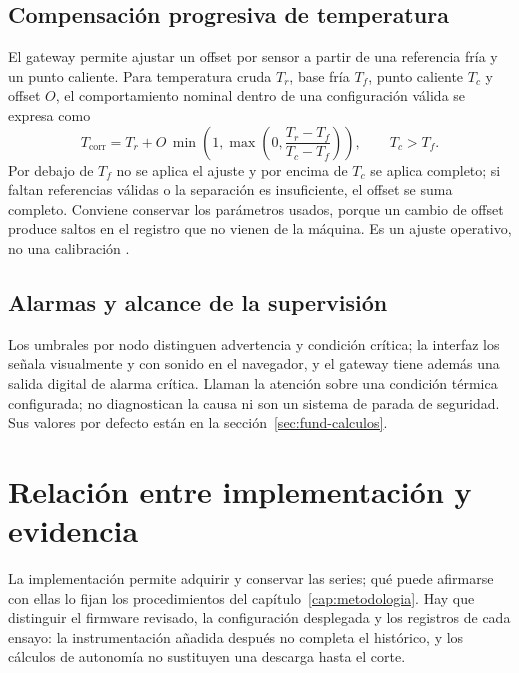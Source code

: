 \subsection{Compensación progresiva de temperatura}
El gateway permite ajustar un offset por sensor a partir de una referencia fría y un punto caliente. Para temperatura cruda $T_r$, base fría $T_f$, punto caliente $T_c$ y offset $O$, el comportamiento nominal dentro de una configuración válida se expresa como
\begin{equation}
T_{\mathrm{corr}}=T_r+O\,\min\!\left(1,\max\!\left(0,\frac{T_r-T_f}{T_c-T_f}\right)\right),
\qquad T_c>T_f.
\label{eq:impl-offset}
\end{equation}
Por debajo de $T_f$ no se aplica el ajuste y por encima de $T_c$ se aplica completo; si faltan referencias válidas o la separación es insuficiente, el offset se suma completo. Conviene conservar los parámetros usados, porque un cambio de offset produce saltos en el registro que no vienen de la máquina. Es un ajuste operativo, no una calibración \citep{jcgm2012}.

\subsection{Alarmas y alcance de la supervisión}
Los umbrales por nodo distinguen advertencia y condición crítica; la interfaz los señala visualmente y con sonido en el navegador, y el gateway tiene además una salida digital de alarma crítica. Llaman la atención sobre una condición térmica configurada; no diagnostican la causa ni son un sistema de parada de seguridad. Sus valores por defecto están en la sección~\ref{sec:fund-calculos}.

\section{Relación entre implementación y evidencia}
La implementación permite adquirir y conservar las series; qué puede afirmarse con ellas lo fijan los procedimientos del capítulo~\ref{cap:metodologia}. Hay que distinguir el firmware revisado, la configuración desplegada y los registros de cada ensayo: la instrumentación añadida después no completa el histórico, y los cálculos de autonomía no sustituyen una descarga hasta el corte.
